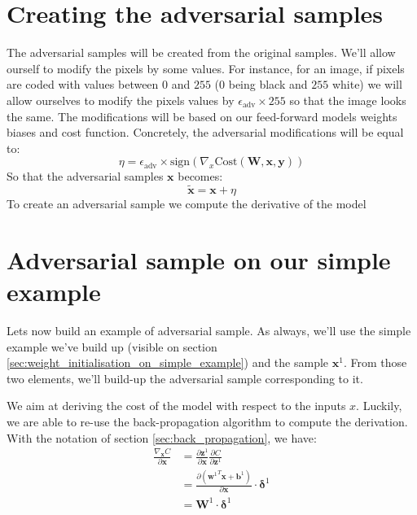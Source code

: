 		

	\section{Creating the adversarial samples}
	\label{sec:creating_the_adversarial_samples}
		The adversarial samples will be created from the original samples. We'll allow ourself to modify the pixels by some values. For instance, for an image, if pixels are coded with values between $0$ and $255$ ($0$ being black and $255$ white) we will allow ourselves to modify the pixels values by $\epsilon_{\text{adv}} \times 255$ so that the image looks the same. The modifications will be based on our feed-forward models weights biases and cost function. Concretely, the adversarial modifications will be equal to:
		$$ \eta = \epsilon_{\text{adv}} \times \text{sign}(\nabla_x \text{Cost}(\boldsymbol{W},\boldsymbol{x},\boldsymbol{y})) $$
		So that the adversarial samples $\boldsymbol{x}$ becomes:
		$$ \tilde{\boldsymbol{x}} = \boldsymbol{x} + \eta $$
		To create an adversarial sample we compute the derivative of the model 


	\section{Adversarial sample on our simple example}
	\label{sub:adversarial_sample_on_the_simple_example}
		Lets now build an example of adversarial sample. As always, we'll use the simple example we've build up (visible on section \ref{sec:weight_initialisation_on_simple_example}) and the sample $\boldsymbol{x}^1$. From those two elements, we'll build-up the adversarial sample corresponding to it.

		We aim at deriving the cost of the model with respect to the inputs $x$. Luckily, we are able to re-use the back-propagation algorithm to compute the derivation. With the notation of section \ref{sec:back_propagation}, we have:
		\begin{equation}
			\begin{split}
				\frac{\nabla_{\boldsymbol{x}} C}{\partial \boldsymbol{x} } 
				&= \frac{\partial \boldsymbol{z}^1}{\partial \boldsymbol{x}} \frac{\partial C}{\partial \boldsymbol{z}^1 } \\
				&= \frac{\partial \left({\boldsymbol{w}^1}^T \boldsymbol{x} + \boldsymbol{b}^1 \right)}{\partial \boldsymbol{x}} \cdot \boldsymbol{\delta}^1 \\
				&= \boldsymbol{W}^1 \cdot \boldsymbol{\delta}^1
			\end{split}
		\end{equation}

